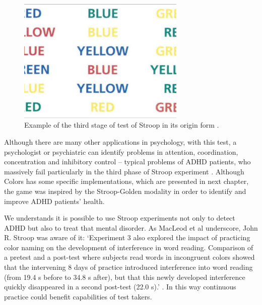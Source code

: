 \begin{figure}[htp]

\begin{center}

  \includegraphics[width=8cm]{chapters/adhd/img/stroop.jpeg}

  \caption{Example of the third stage of test of Stroop in its origin form \citep{iStroop}.}

  \label{stroop}

\end{center}

\end{figure}





Although there are many other applications in psychology, with this test, a psychologist or psychiatric can identify problems in attention, coordination, concentration and inhibitory control -- typical problems of ADHD patients, who  massively fail particularly in the third phase of Stroop experiment \citep{lansbergen}. Although Colors has some specific implementations, which are presented in next chapter, the game was inspired by the Stroop-Golden modality in order to identify and improve ADHD patients' health.



We understands it is possible to use Stroop experiments not only to detect ADHD but also to treat that mental disorder. As MacLeod et al underscore,  John R. Stroop was aware of it: `Experiment 3 also explored the impact of practicing color naming on the development of interference in word reading.  Comparison of a pretest and a post-test where subjects read words in incongruent colors showed that the intervening 8 days of practice introduced interference into word reading (from 19.4 s before to 34.8 s after), but that this newly developed interference quickly disappeared in a second post-test (22.0 s).' \citep{macleod}. In this way continuous practice could benefit capabilities of test takers.



